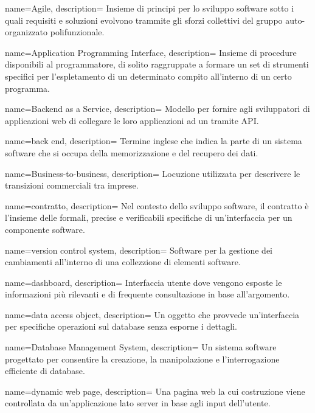  {
name=Agile,
description={
Insieme di principi per lo sviluppo software sotto i quali requisiti e
soluzioni evolvono trammite gli sforzi collettivi del gruppo auto-organizzato
polifunzionale.
}
}

 {
name=Application Programming Interface,
description={
Insieme di procedure disponibili al programmatore, di solito raggruppate a
formare un set di strumenti specifici per l’espletamento di un determinato
compito all’interno di un certo programma.
}
}

 {
name=Backend as a Service,
description={
Modello per fornire agli sviluppatori di applicazioni web di collegare le loro
applicazioni ad un  tramite API.
}
}

 {
name=back end,
description={
Termine inglese che indica la parte di un sistema software che si occupa della
memorizzazione e del recupero dei dati.
}
}

 {
name=Business-to-business,
description={
Locuzione utilizzata per descrivere le transizioni commerciali tra imprese.
}
}

 {
name=contratto,
description={
Nel contesto dello sviluppo software, il contratto è l'insieme delle formali,
precise e verificabili specifiche di un'interfaccia per un componente software.
}
}

 {
name=version control system,
description={
Software per la gestione dei cambiamenti all'interno di una collezzione di
elementi software.
}
}

 {
name=dashboard,
description={
Interfaccia utente dove vengono esposte le informazioni più rilevanti e di
frequente consultazione in base all'argomento.
}
}

 {
name=data access object,
description={
Un oggetto che provvede un'interfaccia per specifiche operazioni sul database
senza esporne i dettagli.
}
}

 {
name=Database Management System,
description={
Un sistema software progettato per consentire la creazione, la manipolazione
e l'interrogazione efficiente di database.
}
}

 {
name=dynamic web page,
description={
Una pagina web la cui costruzione viene controllata da un'applicazione lato
server in base agli input dell'utente.
}
}

